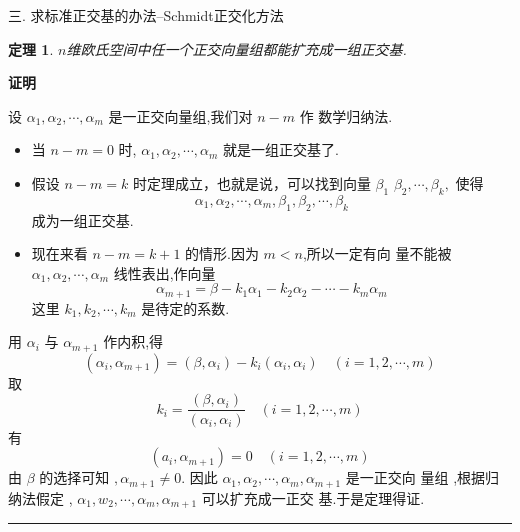 \documentclass[13pt]{beamer}
\newtheorem{thm}{定理}
\def\qed{\nopagebreak\hfill{\rule{4pt}{7pt}}\medbreak}
\def\pf{{\bf 证明~~ }}
\begin{document}
\begin{frame}
{三. 求标准正交基的办法--Schmidt正交化方法}
\begin{thm}
$n$维欧氏空间中任一个正交向量组都能扩充成一组正交基.
\end{thm}
\pf 
\small{
设 ${\alpha}_{1}, {\alpha}_{2}, \cdots, {\alpha}_{m}$ 是一正交向量组,我们对 $n-m$ 作
数学归纳法.
\begin{itemize}
\item 当 $n-m=0$ 时, ${\alpha}_{1}, {\alpha}
_{2}, \cdots, {\alpha}_{m}$ 就是一组正交基了.

\item 假设 $n-m=k$ 时定理成立，也就是说，可以找到向量 ${\beta}_{1}$
${\beta}_{2}, \cdots, {\beta}_{k},$ 使得
\[
{\alpha}_{1}, {\alpha}_{2}, \cdots, {\alpha}_{m}, {\beta}_{1}, {\beta}_{2}, \cdots, {\beta}_{k}
\]
成为一组正交基. 

\item 现在来看 $n-m=k+1$ 的情形.因为 $m<n$,所以一定有向 量不能被 ${\alpha}_{1}, {\alpha}_{2}, \cdots, {\alpha}_{m}$ 线性表出,作向量
\[
{\alpha}_{m+1}={\beta}-k_{1} {\alpha}_{1}-k_{2} {\alpha}_{2}-\cdots-k_{m} {\alpha}_{m}
\]
这里 $k_{1}, k_{2}, \cdots, k_{m}$ 是待定的系数.
\end{itemize}
}
\end{frame}


\begin{frame}
用 ${\alpha}_{i}$ 与 ${\alpha}_{m+1}$ 作内积,得
\[
\left({\alpha}_{i}, {\alpha}_{m+1}\right)=\left({\beta}, {\alpha}_{i}\right)-k_{i}\left({\alpha}_{i}, {\alpha}_{i}\right) \quad(i=1,2, \cdots, m)
\]
取
\[
k_{i}=\frac{\left({\beta}, {\alpha}_{i}\right)}{\left({\alpha}_{i}, {\alpha}_{i}\right)} \quad(i=1,2, \cdots, m)
\]
有
\[
\left({a}_{i}, {\alpha}_{m+1}\right)=0 \quad(i=1,2, \cdots, m)
\]
由 ${\beta}$ 的选择可知 $, {\alpha}_{m+1} \neq {0} .$ 因此 ${\alpha}_{1}, {\alpha}_{2}, \cdots, {\alpha}_{m}, {\alpha}_{m+1}$ 是一正交向
量组 ,根据归纳法假定 , ${\alpha}_{1}, {w}_{2}, \cdots, {\alpha}_{m}, {\alpha}_{m+1}$ 可以扩充成一正交
基.于是定理得证. 
\qed
\end{frame}
\end{document}
